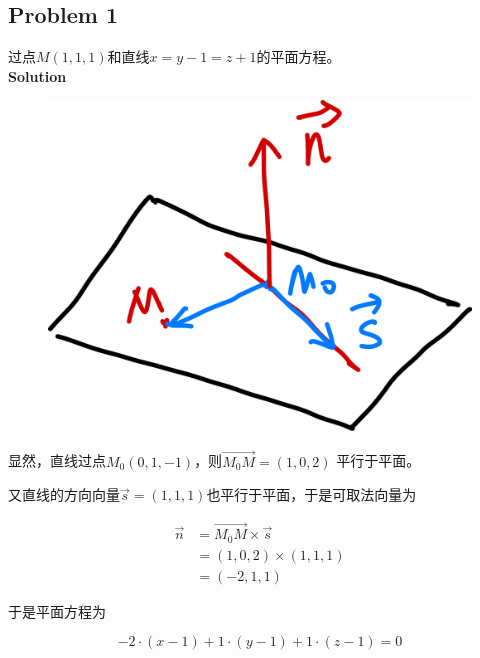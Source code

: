 \documentclass[
	11pt, %
	a4paper, %
]{WhuSakuraBook}
\begin{document}
\subsection{Problem 1}

    过点\(M\left(1,1,1\right)\)和直线\(x=y-1=z+1\)的平面方程。
    \\

    \textbf{Solution}
    \\

    \begin{figure}
        \centering
        \includegraphics[scale=0.06]{"Chapter 08 images/pic19.png"}
        \label{pic19}
    \end{figure}

    显然，直线过点\(M_{0}\left(0,1,-1\right)\)，则\(\overrightarrow{M_{0}M} = \left(1,0,2\right)\)
    平行于平面。

    又直线的方向向量\(\overrightarrow{s} = \left(1,1,1\right)\)也平行于平面，于是可取法向量为

    \begin{align*}
        \overrightarrow{n} &= \overrightarrow{M_{0}M} \times \overrightarrow{s} \\
        &= \left(1,0,2\right) \times \left(1,1,1\right) \\
        &= \left(-2,1,1\right)
    \end{align*}

    于是平面方程为

    \[
        -2 \cdot \left(x-1\right) + 1 \cdot \left(y-1\right) + 1 \cdot \left(z-1\right) = 0
    \]
\end{document}
